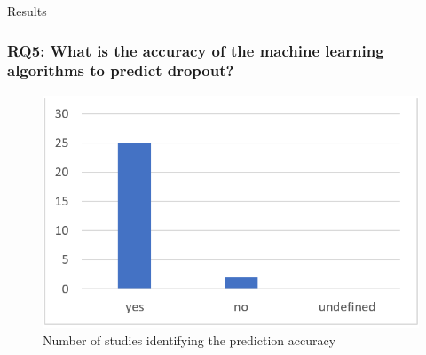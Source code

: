 \documentclass[10pt]{beamer}
\begin{document}
\begin{frame}[fragile]{Results}
	\frametitle{RQ5: What is the accuracy of the machine learning algorithms to predict dropout?}
	\begin{figure}
		\includegraphics[scale=0.5]{../img/predictionAccuracy.png}
		\caption{Number of studies identifying the prediction accuracy}
		\label{figure3}
	\end{figure}
\end{frame}

\end{document}
